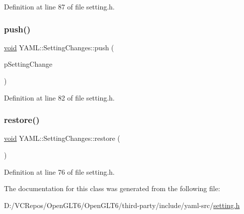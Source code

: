 Definition at line 87 of file setting.\+h.

\mbox{\label{class_y_a_m_l_1_1_setting_changes_a20d6ae434d53a514067b726db231a772}} 
\subsubsection{\texorpdfstring{push()}{push()}}
{\footnotesize\ttfamily \mbox{\hyperlink{glad_8h_a950fc91edb4504f62f1c577bf4727c29}{void}} Y\+A\+M\+L\+::\+Setting\+Changes\+::push (\begin{DoxyParamCaption}\item[{std\+::unique\+\_\+ptr$<$ \mbox{\hyperlink{class_y_a_m_l_1_1_setting_change_base}{Setting\+Change\+Base}} $>$}]{p\+Setting\+Change }\end{DoxyParamCaption})\hspace{0.3cm}{\ttfamily [inline]}}



Definition at line 82 of file setting.\+h.

\mbox{\label{class_y_a_m_l_1_1_setting_changes_acf528bbc50a20a67b9b951cc82b42462}} 
\subsubsection{\texorpdfstring{restore()}{restore()}}
{\footnotesize\ttfamily \mbox{\hyperlink{glad_8h_a950fc91edb4504f62f1c577bf4727c29}{void}} Y\+A\+M\+L\+::\+Setting\+Changes\+::restore (\begin{DoxyParamCaption}{ }\end{DoxyParamCaption})\hspace{0.3cm}{\ttfamily [inline]}}



Definition at line 76 of file setting.\+h.



The documentation for this class was generated from the following file\+:\begin{DoxyCompactItemize}
\item 
D\+:/\+V\+C\+Repos/\+Open\+G\+L\+T6/\+Open\+G\+L\+T6/third-\/party/include/yaml-\/src/\mbox{\hyperlink{setting_8h}{setting.\+h}}\end{DoxyCompactItemize}
